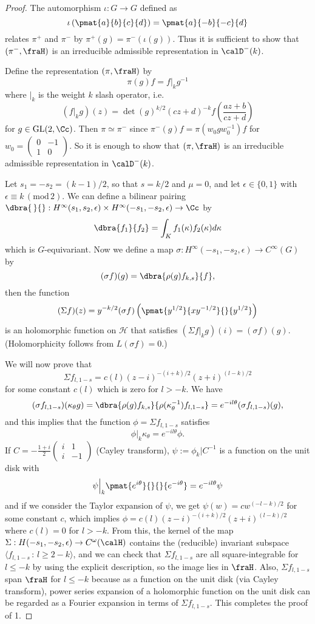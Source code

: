 \documentclass{article}
\newcommand{\GL}{\mathrm{GL}}
\newcommand{\Mod}[1]{\,(\mathrm{mod}\,#1)}
\newcommand{\smat}[4]{\left(\begin{smallmatrix} #1 & #2 \\ #3 & #4 \end{smallmatrix}\right)}
\begin{document}
\begin{proof}
The automorphism $\iota:G\to G$ defined as 
$$
\iota\left(\pmat{a}{b}{c}{d}\right)= \pmat{a}{-b}{-c}{d}
$$
relates $\pi^{+}$ and $\pi^{-}$ by $\pi^{+}(g)= \pi^{-}(\iota(g))$. Thus it is sufficient to show that $(\pi^{-}, \fraH)$ is an irreducible admissible representation in $\calD^{-}(k)$. 

Define the representation $(\pi, \fraH)$ by 
$$
\pi(g) f= f|_{k}g^{-1}
$$
where $|_{k}$ is the weight $k$ slash operator, i.e.
$$
(f|_{k}g)(z) = \det(g)^{k/2} (cz+d)^{-k} f\left( \frac{az+b}{cz+d}\right)
$$
for $g\in \GL(2, \Cc)$. Then $\pi\simeq \pi^{-}$ since $\pi^{-}(g)f = \pi(w_{0}gw_{0}^{-1})f$ for $w_{0} = \smat{0}{-1}{1}{0}$. So it is enough to show that $(\pi, \fraH)$ is an irreducible admissible representation in $\calD^{-}(k)$. 

Let $s_{1} = -s_{2} = (k-1)/2$, so that $s = k/2$ and $\mu = 0$, and let $\epsilon\in \{0, 1\}$ with $\epsilon\equiv k\Mod{2}$. We can define a bilinear pairing $\dbra{\,}{}: H^{\infty}(s_{1}, s_{2}, \epsilon) \times H^{\infty} (-s_{1}, -s_{2}, \epsilon) \to \Cc$ by 
$$
\dbra{f_{1}}{f_{2}} = \int_{K} f_{1}(\kappa)f_{2}(\kappa) d\kappa
$$
which is $G$-equivariant. Now we define a map $\sigma:H^{\infty}(-s_{1}, -s_{2}, \epsilon)\to C^{\infty}(G)$ by 
$$
(\sigma f)(g) = \dbra{\rho(g)f_{k, s}}{f}, 
$$
then the function 
$$
(\Sigma f)(z) = y^{-k/2}(\sigma f)\left(\pmat{y^{1/2}}{xy^{-1/2}}{}{y^{1/2}}\right)
$$
is an holomorphic function on $\mathcal{H}$ that satisfies $(\Sigma f|_{k}g)(i) = (\sigma f)(g)$. 
(Holomorphicity follows from $L(\sigma f) =0$.)

We will now prove that 
$$
\Sigma f_{l, 1-s} = c(l) (z-i)^{-(i+k)/2}(z+i)^{(l-k)/2}
$$
for some constant $c(l)$ which is zero for $l>-k$. We have
$$
(\sigma f_{l, 1-s})(\kappa_{\theta}g) = \dbra{\rho(g)f_{k, s}}{\rho(\kappa_{\theta}^{-1})f_{l, 1-s}} = e^{-il\theta}(\sigma f_{l, 1-s})(g),
$$
and this implies that the function $\phi = \Sigma f_{l, 1-s}$ satisfies
$$
\phi|_{k}\kappa_{\theta} = e^{-il\theta}\phi. 
$$
If $C = -\frac{1+i}{2} \smat{i}{1}{i}{-1}$ (Cayley transform), $\psi:= \phi_{k}|C^{-1}$ is a function on the unit disk with
$$
\psi\Big|_{k} \pmat{e^{i\theta}}{}{}{e^{-i\theta}} = e^{-il\theta}\psi
$$
and if we consider the Taylor expansion of $\psi$, we get $\psi(w) = cw^{(-l-k)/2}$ for some constant $c$, which implies $\phi= c(l) (z-i)^{-(i+k)/2}(z+i)^{(l-k)/2}$ where $c(l) =0$ for $l>-k$. 
From this, the kernel of the map $\Sigma:H(-s_{1}, -s_{2}, \epsilon) \to C^{\omega}(\calH)$ contains the (reducible) invariant subspace $\langle f_{l, 1-s}\,:\, l\geq 2-k\rangle$, and we can check that $\Sigma f_{l, 1-s}$ are all square-integrable for $l\leq -k$ by using the explicit description, so the image lies in $\fraH$. Also, $\Sigma f_{l, 1-s}$ span $\fraH$ for $l\leq -k$ because as a function on the unit disk (via Cayley transform), power series expansion of a holomorphic function on the unit disk can be regarded as a Fourier expansion in terms of $\Sigma f_{l, 1-s}$.
This completes the proof of 1. 


\end{proof}
\end{document}
